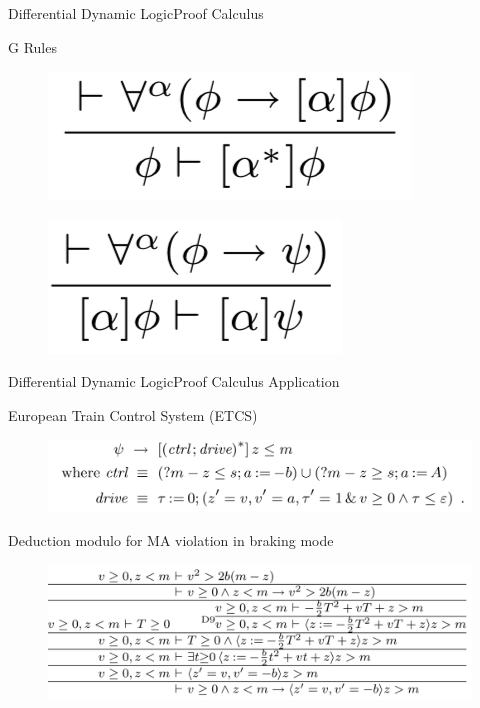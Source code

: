 \documentclass{beamer}
\begin{document}
\begin{frame}{Differential Dynamic Logic}{Proof Calculus}
  \begin{block}{G Rules}
  \begin{figure}
    \centering
    \includegraphics[scale=0.5]{G-introduce-precondition}
  \end{figure}
  \begin{figure}
    \centering
    \includegraphics[scale=0.5]{G-model-precondition}
  \end{figure}
  \end{block}
\end{frame}

\begin{frame}{Differential Dynamic Logic}{Proof Calculus Application}
 \begin{block}{European Train Control System (ETCS)}
   \begin{figure}
     \includegraphics[scale=0.4]{ects-safety}
   \end{figure}
 \end{block}
 \begin{block}{Deduction modulo for MA violation in braking mode}
   \begin{figure}
     \includegraphics[scale=0.4]{ects-precondition-violation}
   \end{figure}
 \end{block}
\end{frame}
\end{document}

